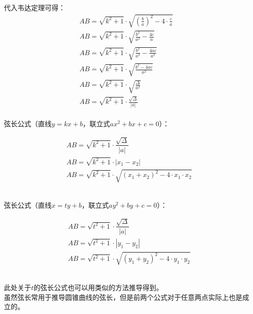\documentclass[UTF8]{ctexart}
\begin{document}
    代入韦达定理可得：
    \begin{align}
        &AB=\sqrt{k^2+1}\cdot\sqrt{\left(\frac{b}{a}\right)^2-4\cdot\frac{c}{a}}~~~~\\[3mm]
        &AB=\sqrt{k^2+1}\cdot\sqrt{\frac{b^2}{a^2}-\frac{4c}{a}}\\[3mm]
        &AB=\sqrt{k^2+1}\cdot\sqrt{\frac{b^2}{a^2}-\frac{4ac}{a^2}}\\[3mm]
        &AB=\sqrt{k^2+1}\cdot\sqrt{\frac{b^2-4ac}{a^2}}\\[3mm]
        &AB=\sqrt{k^2+1}\cdot\sqrt{\frac{\Delta}{a^2}}\\[3mm]
        &AB=\sqrt{k^2+1}\cdot\frac{\sqrt{\Delta}}{|a|}
    \end{align}\\
    弦长公式（直线$y=kx+b$，联立式$ax^2+bx+c=0$）：\vspace{8pt}
    \begin{large}
        \begin{align*}
            &AB=\sqrt{k^2+1}\cdot\dfrac{\sqrt{\Delta}}{|a|}\\[6mm]
            &AB=\sqrt{k^2+1}\cdot|x_1-x_2|\\[6mm]
            &AB=\sqrt{k^2+1}\cdot\sqrt{(x_1+x_2)^2-4\cdot x_1\cdot x_2}
        \end{align*}
    \end{large}\\
    弦长公式（直线$x=ty+b$，联立式$ay^2+by+c=0$）：\vspace{8pt}
    \begin{large}
        \begin{align*}
            &AB=\sqrt{t^2+1}\cdot\dfrac{\sqrt{\Delta}}{|a|}\\[6mm]
            &AB=\sqrt{t^2+1}\cdot|y_1-y_2|\\[6mm]
            &AB=\sqrt{t^2+1}\cdot\sqrt{(y_1+y_2)^2-4\cdot y_1\cdot y_2}
        \end{align*}
    \end{large}\\
    此处关于$t$的弦长公式也可以用类似的方法推导得到。\\[3mm]
    虽然弦长常用于推导圆锥曲线的弦长，但是前两个公式对于任意两点实际上也是成立的。

\newpage
\end{document}
